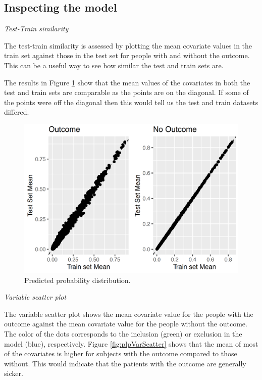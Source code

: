 \documentclass[11pt]{book}
\begin{document}
\subsection{Inspecting the model}\label{inspecting-the-model}

\emph{Test-Train similarity}

The test-train similarity is assessed by plotting the mean covariate
values in the train set against those in the test set for people with
and without the outcome. This can be a useful way to see how similar the
test and train sets are.

The results in Figure \ref{fig:plpTestTrain} show that the mean values
of the covariates in both the test and train sets are comparable as the
points are on the diagonal. If some of the points were off the diagonal
then this would tell us the test and train datasets differed.

\begin{figure}

{\centering \includegraphics[width=1\linewidth]{images/PatientLevelPrediction/generalizability} 

}

\caption{Predicted probability distribution.}\label{fig:plpTestTrain}
\end{figure}

\emph{Variable scatter plot}

The variable scatter plot shows the mean covariate value for the people
with the outcome against the mean covariate value for the people without
the outcome. The color of the dots corresponds to the inclusion (green)
or exclusion in the model (blue), respectively. Figure
\ref{fig:plpVarScatter} shows that the mean of most of the covariates is
higher for subjects with the outcome compared to those without. This
would indicate that the patients with the outcome are generally sicker.
\end{document}
